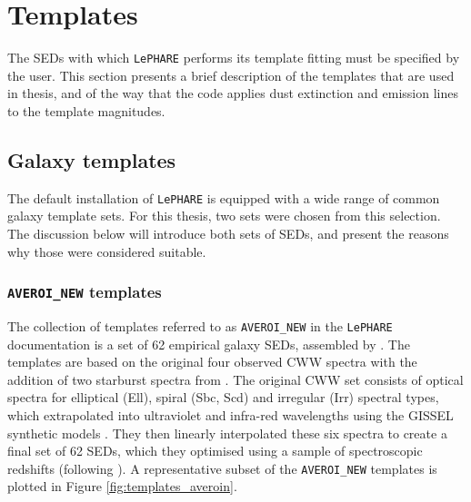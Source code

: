 \section{Templates}\label{section:templates}
The SEDs with which \texttt{LePHARE} performs its template fitting must be specified by the user. This section presents a brief description of the templates that are used in thesis, and of the way that the code applies dust extinction and emission lines to the template magnitudes. \par


\subsection{Galaxy templates}\label{subsection:galaxy_templates}
The default installation of \texttt{LePHARE} is equipped with a wide range of common galaxy template sets. For this thesis, two sets were chosen from this selection. The discussion below will introduce both sets of SEDs, and present the reasons why those were considered suitable. \par




\subsubsection{\texttt{AVEROI\_NEW} templates}\label{subsubsection:AVEROI_NEW}
The collection of templates referred to as \texttt{AVEROI\_NEW} in the \texttt{LePHARE} documentation is a set of 62 empirical galaxy SEDs, assembled by \cite{2007A&A...476..137A}. The templates are based on the original four observed CWW spectra \citep{1980ApJS...43..393C} with the addition of two starburst spectra from \cite{1996ApJ...467...38K}. The original CWW set consists of optical spectra for elliptical (Ell), spiral (Sbc, Scd) and irregular (Irr) spectral types, which \cite{2007A&A...476..137A} extrapolated into ultraviolet and infra-red wavelengths using the GISSEL synthetic models \citep{2003MNRAS.344.1000B}. They then linearly interpolated these six spectra to create a final set of 62 SEDs, which they optimised using a sample of spectroscopic redshifts (following \citealt{2006A&A...457..841I}). A representative subset of the \texttt{AVEROI\_NEW} templates is plotted in Figure \ref{fig:templates_averoin}.\par
 
 
